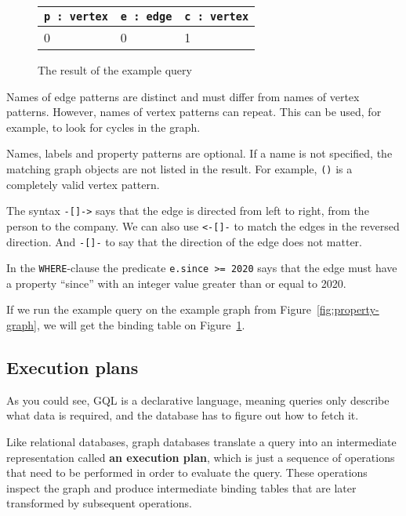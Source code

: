 \documentclass[14pt]{constructor-thesis}
\begin{document}
\begin{figure}[b]
  \centering
  
  \begin{tabular}{ |p{3cm}|p{3cm}|p{3cm}|  }
    \hline
    \texttt{p : vertex} & \texttt{e : edge} & \texttt{c : vertex} \\
    \hline
    0 & 0 & 1 \\
    \hline
  \end{tabular}

  \caption{The result of the example query}
  \label{fig:example-query-binding-table}
\end{figure}

Names of edge patterns are distinct and must differ from names of vertex patterns. However, names of vertex patterns can repeat. This can be used, for example, to look for cycles in the graph.

Names, labels and property patterns are optional. If a name is not specified, the matching graph objects are not listed in the result. For example, \texttt{()} is a completely valid vertex pattern.

The syntax \texttt{-[]->} says that the edge is directed from left to right, from the person to the company. We can also use \texttt{<-[]-} to match the edges in the reversed direction. And \texttt{-[]-} to say that the direction of the edge does not matter.

In the \texttt{WHERE}-clause the predicate \verb+e.since >= 2020+ says that the edge must have a property ``since'' with an integer value greater than or equal to 2020.

If we run the example query on the example graph from Figure~\ref{fig:property-graph}, we will get the binding table on Figure~\ref{fig:example-query-binding-table}.

\subsection{Execution plans}

As you could see, GQL is a declarative language, meaning queries only describe what data is required, and the database has to figure out how to fetch it.

Like relational databases, graph databases translate a query into an intermediate representation called \textbf{an execution plan}, which is just a sequence of operations that need to be performed in order to evaluate the query. These operations inspect the graph and produce intermediate binding tables that are later transformed by subsequent operations.
\end{document}
